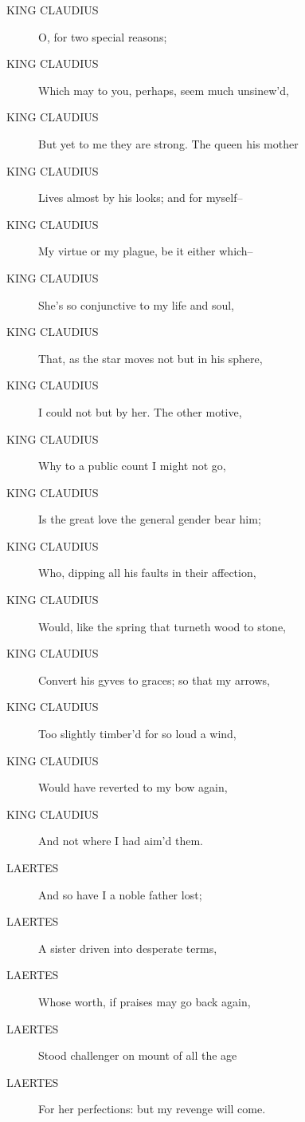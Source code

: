 \documentclass{article}
\begin{document}
\begin{description}
            
\item[KING CLAUDIUS] O, for two special reasons;
\item[KING CLAUDIUS] Which may to you, perhaps, seem much unsinew'd,
\item[KING CLAUDIUS] But yet to me they are strong. The queen his mother
\item[KING CLAUDIUS] Lives almost by his looks; and for myself--
\item[KING CLAUDIUS] My virtue or my plague, be it either which--
\item[KING CLAUDIUS] She's so conjunctive to my life and soul,
\item[KING CLAUDIUS] That, as the star moves not but in his sphere,
\item[KING CLAUDIUS] I could not but by her. The other motive,
\item[KING CLAUDIUS] Why to a public count I might not go,
\item[KING CLAUDIUS] Is the great love the general gender bear him;
\item[KING CLAUDIUS] Who, dipping all his faults in their affection,
\item[KING CLAUDIUS] Would, like the spring that turneth wood to stone,
\item[KING CLAUDIUS] Convert his gyves to graces; so that my arrows,
\item[KING CLAUDIUS] Too slightly timber'd for so loud a wind,
\item[KING CLAUDIUS] Would have reverted to my bow again,
\item[KING CLAUDIUS] And not where I had aim'd them.
\end{description}
          
\begin{description}
            
\item[LAERTES] And so have I a noble father lost;
\item[LAERTES] A sister driven into desperate terms,
\item[LAERTES] Whose worth, if praises may go back again,
\item[LAERTES] Stood challenger on mount of all the age
\item[LAERTES] For her perfections: but my revenge will come.
\end{description}
          
\end{document}
